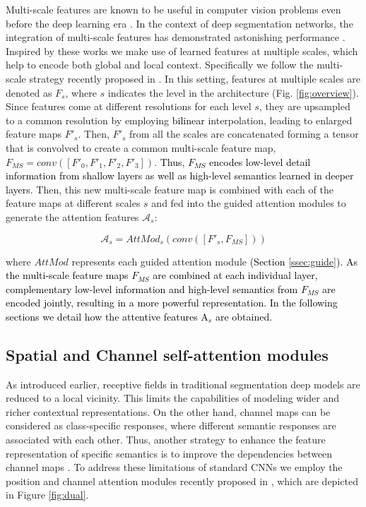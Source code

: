 \documentclass[journal]{IEEEtran}
\begin{document}
Multi-scale features are known to be useful in computer vision problems even before the deep learning era \cite{arbelaez2010contour}. In the context of deep segmentation networks, the integration of multi-scale features has demonstrated astonishing performance \cite{chen2016attention,hariharan2015hypercolumns,mostajabi2015feedforward}.
Inspired by these works we make use of learned features at multiple scales, which help to encode both global and local context. Specifically we follow the multi-scale strategy recently proposed in \cite{wang18d}. In this setting, features at multiple scales are denoted as $F_s$, where $s$ indicates the level in the architecture (Fig. \ref{fig:overview}). Since features come at different resolutions for each level $s$, they are upsampled to a common resolution by employing \textcolor{black}{bilinear} interpolation, leading to enlarged feature maps $F'_s$. Then, $F'_s$ from all the scales are concatenated forming a tensor that is convolved to create a common multi-scale feature map, $F_{MS}=conv([F'_0,F'_1,F'_2,F'_3])$. \textcolor{black}{Thus, $F_{MS}$ encodes low-level detail information from shallow layers as well as high-level semantics learned in deeper layers.} Then, this new multi-scale feature map is combined with each of the feature maps at different scales $s$ and fed into the guided attention modules to generate the attention features $\mathcal{A}_s$:

\begin{equation}
    \mathcal{A}_{s} = AttMod_{s}(conv([F'_{s},F_{MS}]))
\end{equation}

where $AttMod$ represents each guided attention module \textcolor{black}{(Section \ref{ssec:guide})}. \textcolor{black}{As the multi-scale feature maps $F_{MS}$ are combined at each individual layer, complementary low-level information and high-level semantics from $F_{MS}$ are encoded jointly, resulting in a more powerful representation. In the following sections we detail how the attentive features A$_s$ are obtained.}


\subsection{Spatial and Channel self-attention modules}
As introduced earlier, receptive fields in traditional segmentation deep models are reduced to a local vicinity. This limits the capabilities of modeling wider and richer contextual representations. On the other hand, channel maps can be considered as class-specific responses, where different semantic responses are associated with each other. Thus, another strategy to enhance the feature representation of specific semantics is to improve the dependencies between channel maps \cite{chen2017sca}. To address these limitations of standard CNNs we employ the position and channel attention modules recently proposed in \cite{fu2018dual}, which are depicted in Figure \ref{fig:dual}.
\end{document}
